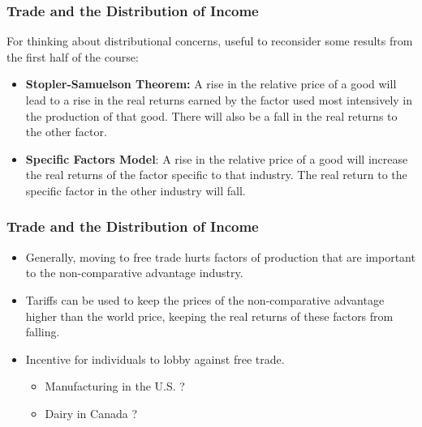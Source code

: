 \documentclass{beamer}
\begin{document}
\begin{frame}
	\frametitle{Trade and the Distribution of Income}
For thinking about distributional concerns, useful to reconsider some results from the first half of the course:
\begin{itemize}
	\item 	\textbf{Stopler-Samuelson Theorem:} A rise in the relative price of a good will lead to a rise in the real returns earned by the factor used most intensively in the production of that good. There will also be a fall in the real returns to the other factor.
	\item \textbf{Specific Factors Model}: A rise in the relative price of a good will increase the real returns of the factor specific to that industry. The real return to the specific factor in the other industry will fall. 
\end{itemize}


\end{frame}


\begin{frame}
	\frametitle{Trade and the Distribution of Income}
	
\begin{itemize}
	\item Generally, moving to free trade hurts factors of production that are important to the non-comparative advantage industry.
	\item Tariffs can be used to keep the prices of the non-comparative advantage higher than the world price, keeping the real returns of these factors from falling.
	\item Incentive for individuals to lobby against free trade.
		\begin{itemize}
			\item Manufacturing in the U.S. ?
			\item Dairy in Canada ?
		\end{itemize}
\end{itemize}

	
\end{frame}
\end{document}
